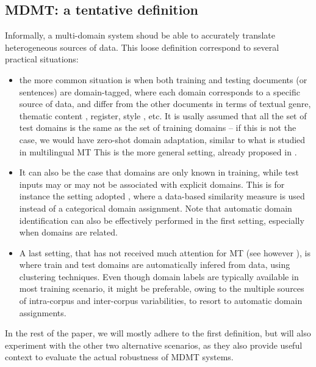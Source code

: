 \documentclass[11pt]{article}
\begin{document}
\subsection{MDMT: a tentative definition}
Informally, a multi-domain system shoud be able to accurately translate heterogeneous sources of data. This loose definition correspond to several practical situations:
\begin{itemize}
\item the more common situation is when both training and testing documents (or sentences) are domain-tagged, where each domain corresponds to a specific source of data, and differ from the other documents in terms of textual genre, thematic content \cite{Zhang16topicinformed}, register, style \cite{Niu18multitask}, etc. It is usally assumed that all the set of test domains is the same as the set of training domains -- if this is not the case, we would have zero-shot domain adaptation, similar to what is studied in multilingual MT \cite{Firat16multiway,Johnson17google,Platanios18contextual}  This is the more general setting, already proposed in \cite{Dredze09multidomain}.

\item It can also be the case that domains are only known in training, while test inputs may or may not be associated with explicit domains. This is for instance the setting adopted \cite{Farajian17multidomain}, where a data-based similarity measure is used instead of a categorical domain assignment. Note that automatic domain identification can also be effectively performed in the first setting, especially when domains are related.
  
\item A last setting, that has not received much attention for MT (see however \cite{Sennrich13multidomain}), is where train and test domains are automatically infered from data, using clustering techniques. Even though domain labels are typically available in most training scenario, it might be preferable, owing to the multiple sources of intra-corpus and inter-corpus variabilities, to resort to automatic domain assignments.
\end{itemize}

In the rest of the paper, we will mostly adhere to the first definition, but will also experiment with the other two alternative scenarios, as they also provide useful context to evaluate the actual robustness of MDMT systems.
\end{document}
